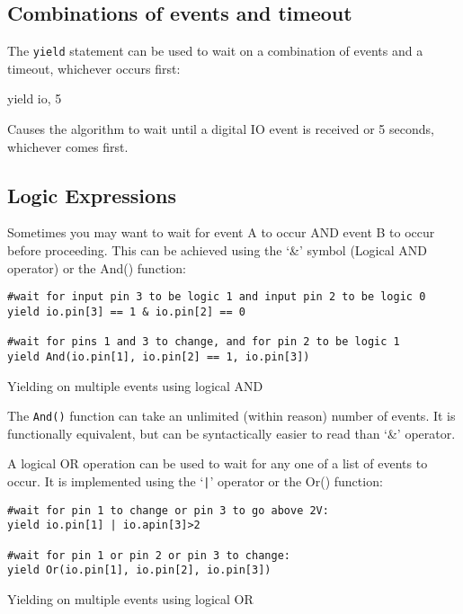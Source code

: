\documentclass[a4paper, 12pt]{article}
\begin{document}
\subsection{Combinations of events and timeout}
The \texttt{yield} statement can be used to wait on a combination of events and
a timeout, whichever occurs first:

\begin{verbatimtab}
yield io, 5
\end{verbatimtab}

Causes the algorithm to wait until a digital IO event is received or 5 seconds,
whichever comes first.


\subsection{Logic Expressions}
Sometimes you may want to wait for event A to occur AND event B to occur before proceeding. This can be achieved using the `\&' symbol (Logical AND operator) or the And() function:
\begin{python}
\begin{verbatim}
#wait for input pin 3 to be logic 1 and input pin 2 to be logic 0
yield io.pin[3] == 1 & io.pin[2] == 0

#wait for pins 1 and 3 to change, and for pin 2 to be logic 1
yield And(io.pin[1], io.pin[2] == 1, io.pin[3]) 
\end{verbatim}
\caption{\label{py:yieldand}Yielding on multiple events using logical AND}
\end{python}

The \texttt{And()} function can take an unlimited (within reason) number of events. It is functionally equivalent, but can be syntactically easier to read than `\&' operator.

\vspace{12pt}

A logical OR operation can be used to wait for any one of a list of events to occur. It is implemented using the `\texttt{|}' operator or the Or() function:
\begin{python}
\begin{verbatim}
#wait for pin 1 to change or pin 3 to go above 2V:
yield io.pin[1] | io.apin[3]>2

#wait for pin 1 or pin 2 or pin 3 to change:
yield Or(io.pin[1], io.pin[2], io.pin[3])
\end{verbatim}
\caption{\label{py:yieldor}Yielding on multiple events using logical OR}
\end{python}
\end{document}
